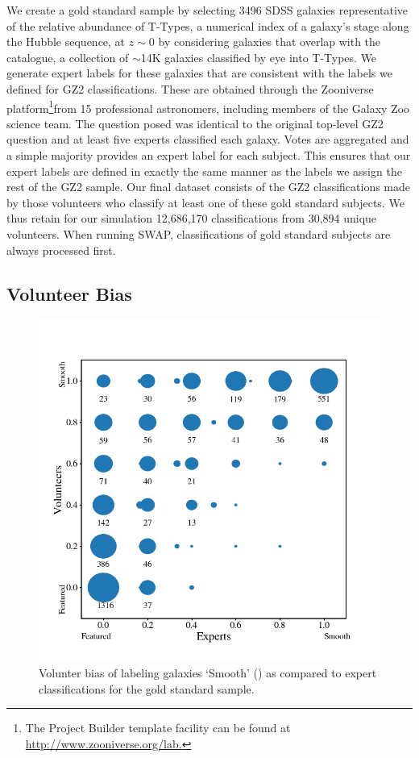 We create a gold standard sample by selecting 3496 SDSS galaxies representative of the relative abundance of T-Types, a numerical index of a galaxy's stage along the Hubble sequence, at $z\sim0$ by considering galaxies that overlap with the~\cite{NairAbraham2010} catalogue, a collection of $\sim$14K galaxies classified by eye into T-Types. We generate expert labels for these galaxies that are consistent with the labels we defined for GZ2 classifications. These are obtained through the Zooniverse platform\footnote{The Project Builder template facility can be found at \url{http://www.zooniverse.org/lab.}}from 15 professional astronomers, including members of the Galaxy Zoo science team.  The question posed was identical to the original top-level GZ2 question and at least five experts classified each galaxy. Votes are aggregated and a simple majority provides an expert label for each subject. This ensures that our expert labels are defined in exactly the same manner as the labels we assign the rest of the GZ2 sample. Our final dataset consists of the GZ2 classifications made by those volunteers who classify at least one of these gold standard subjects. We thus retain for our simulation 12,686,170 classifications from 30,894 unique volunteers. When running SWAP, classifications of gold standard subjects are always processed first. 



\subsection{Volunteer Bias}\label{chap3: bias}

\begin{figure}
\centering
\includegraphics[width=5in]{Figures/expert_vs_volunteer_votes_highskill_11-6-17.png}
\caption[]{Volunter bias of labeling galaxies `Smooth' (\notfeat) as compared to expert classifications for the gold standard sample.}
\label{fig: volunteer bias}
\end{figure}

